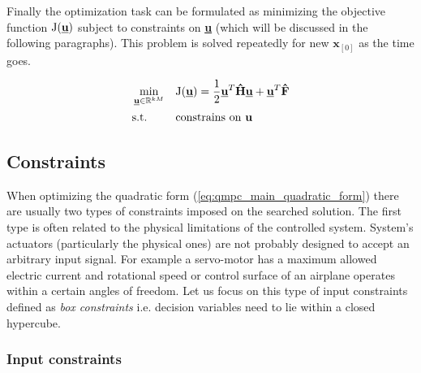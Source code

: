Finally the optimization task can be formulated as minimizing the objective function $\mathrm{J}(\textbf{\underline{u}})$ subject to constraints on \textbf{\underline{u}} (which will be discussed in the following paragraphs). This problem is solved repeatedly for new $\textbf{x}_{[0]}$ as the time goes.

\begin{equation}
\label{eq:qmpc_main_quadratic_form}
\begin{aligned}
& \min_{\textbf{\underline{u}} \in \mathbb{R}^{kM}}
& & \mathrm{J}(\underline{\textbf{u}}) = \frac{1}{2}\textbf{\underline{u}}^T\textbf{\^H}\textbf{\underline{u}} + \textbf{\underline{u}}^T\textbf{\^F}\\
& \text{s.t.}
& & \text{constrains on \textbf{u}}
\end{aligned}
\end{equation}


\subsection{Constraints}

When optimizing the quadratic form (\ref{eq:qmpc_main_quadratic_form}) there are usually two types of constraints imposed on the searched solution. The first type is often related to the physical limitations of the controlled system. System's actuators (particularly the physical ones) are not probably designed to accept an arbitrary input signal. For example a servo-motor has a maximum allowed electric current and rotational speed or control surface of an airplane operates within a certain angles of freedom. Let us focus on this type of input constraints defined as \textit{box constraints} i.e. decision variables need to lie within a closed hypercube.

\subsubsection{Input constraints}

